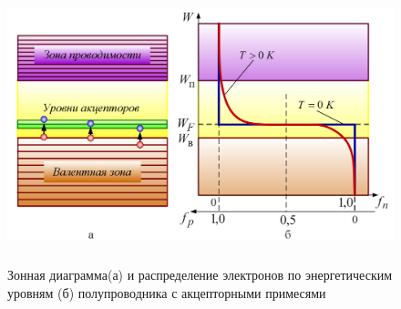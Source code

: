     
	\begin{figure}[h]
		\centering
		\includegraphics[height=8cm]{img/11} 
		\captionsetup{font=footnotesize}
		\caption{Зонная диаграмма(а) и распределение электронов по энергетическим уровням (б) полупроводника с акцепторными примесями} 
	\end{figure}

	
